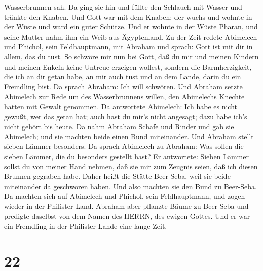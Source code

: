 Wasserbrunnen sah. Da ging sie hin und füllte den Schlauch mit Wasser
und tränkte den Knaben.  Und Gott war mit dem Knaben; der
wuchs und wohnte in der Wüste und ward ein guter Schütze. 
Und er wohnte in der Wüste Pharan, und seine Mutter nahm ihm ein Weib
aus Ägyptenland.  Zu der Zeit redete Abimelech und Phichol,
sein Feldhauptmann, mit Abraham und sprach: Gott ist mit dir in allem,
das du tust.  So schwöre mir nun bei Gott, daß du mir und
meinen Kindern und meinen Enkeln keine Untreue erzeigen wollest, sondern
die Barmherzigkeit, die ich an dir getan habe, an mir auch tust und an
dem Lande, darin du ein Fremdling bist.  Da sprach Abraham:
Ich will schwören.  Und Abraham setzte Abimelech zur Rede
um des Wasserbrunnens willen, den Abimelechs Knechte hatten mit Gewalt
genommen.  Da antwortete Abimelech: Ich habe es nicht
gewußt, wer das getan hat; auch hast du mir's nicht angesagt; dazu habe
ich's nicht gehört bis heute.  Da nahm Abraham Schafe und
Rinder und gab sie Abimelech; und sie machten beide einen Bund
miteinander.  Und Abraham stellt sieben Lämmer besonders.
 Da sprach Abimelech zu Abraham: Was sollen die sieben
Lämmer, die du besonders gestellt hast?  Er antwortete:
Sieben Lämmer sollst du von meiner Hand nehmen, daß sie mir zum Zeugnis
seien, daß ich diesen Brunnen gegraben habe.  Daher heißt
die Stätte Beer-Seba, weil sie beide miteinander da geschworen haben.
 Und also machten sie den Bund zu Beer-Seba. Da machten
sich auf Abimelech und Phichol, sein Feldhauptmann, und zogen wieder in
der Philister Land.  Abraham aber pflanzte Bäume zu
Beer-Seba und predigte daselbst von dem Namen des HERRN, des ewigen
Gottes.  Und er war ein Fremdling in der Philister Lande
eine lange Zeit.

\hypertarget{section-21}{%
\section{22}\label{section-21}}

